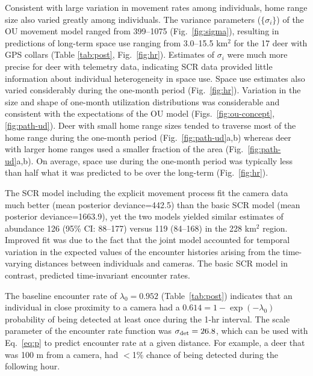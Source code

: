 \documentclass[12pt]{article}
\begin{document}
Consistent with large variation in movement rates 
among individuals, home range size also varied greatly among
individuals. The variance parameters ($\{\sigma_i\}$) of the OU
movement model ranged from 399--1075 (Fig.~\ref{fig:sigma}), resulting in
predictions of long-term space use ranging from 3.0--15.5 km$^2$ for
the 17 deer with GPS collars (Table \ref{tab:post},
Fig.~\ref{fig:hr}). Estimates of 
$\sigma_i$ were much more precise for deer with telemetry data,
indicating SCR data provided little information about
individual heterogeneity in space use. Space use estimates also varied
considerably during the one-month period
(Fig.~\ref{fig:hr}). Variation in the size and shape of one-month
utilization distributions was considerable and consistent with
the expectations of the OU model
(Figs.~\ref{fig:ou-concept}, \ref{fig:path-ud}). Deer with small home
range sizes tended to traverse most of the home range during the
one-month period (Fig.~\ref{fig:path-ud}a,b) whereas deer with larger
home ranges used a smaller fraction of the area (Fig.~\ref{fig:path-ud}a,b).
On average, space use during the one-month period was typically less
than half what it was predicted to be over the long-term (Fig.~\ref{fig:hr}). 


The SCR model including the explicit movement process fit the camera data
much better (mean posterior deviance=442.5) than the basic SCR model
(mean posterior deviance=1663.9), yet the two models yielded similar
estimates of abundance 126 (95\% CI:  88--177) versus 119 (84--168) in the
228 km$^2$ region. Improved fit was due to the fact that the joint
model accounted for temporal variation in the expected values of 
the encounter histories arising from the time-varying distances between
individuals and cameras. The basic SCR model in contrast, predicted 
time-invariant encounter rates. %

The baseline encounter rate of $\lambda_0=0.952$ (Table~\ref{tab:post}) %
indicates that an individual in close proximity to a camera had a
$0.614 = 1-\exp(-\lambda_0)$ probability of being detected at least
once during the 1-hr interval. The scale
parameter of the encounter rate function was $\sigma_{\rm
  det}=26.8$, which can be used with Eq.~\ref{eq:p} to predict
encounter rate at a given distance. For example, a deer that was 100 m
from a camera, had $<$1\% chance of being detected during the
following hour. 
\end{document}
